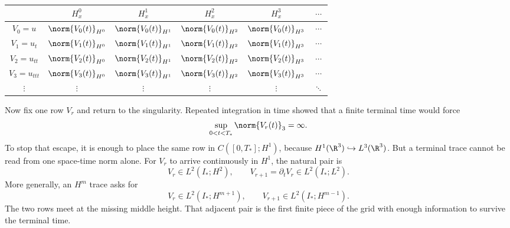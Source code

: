 \begin{center}
\captionsetup{hypcap=false}
\label{tab:MixedDerivativeGrid}
\renewcommand{\arraystretch}{1.4}
\begin{tabular}{@{}c c c c c c@{}}
\toprule
& \(H^0_x\) & \(H^1_x\) & \(H^2_x\) & \(H^3_x\) & \(\cdots\) \\
\midrule
\(V_0=u\) & \(\norm{V_0(t)}_{H^0}\) & \(\norm{V_0(t)}_{H^1}\) & \(\norm{V_0(t)}_{H^2}\) & \(\norm{V_0(t)}_{H^3}\) & \(\cdots\) \\
\(V_1=u_t\) & \(\norm{V_1(t)}_{H^0}\) & \(\norm{V_1(t)}_{H^1}\) & \(\norm{V_1(t)}_{H^2}\) & \(\norm{V_1(t)}_{H^3}\) & \(\cdots\) \\
\(V_2=u_{tt}\) & \(\norm{V_2(t)}_{H^0}\) & \(\norm{V_2(t)}_{H^1}\) & \(\norm{V_2(t)}_{H^2}\) & \(\norm{V_2(t)}_{H^3}\) & \(\cdots\) \\
\(V_3=u_{ttt}\) & \(\norm{V_3(t)}_{H^0}\) & \(\norm{V_3(t)}_{H^1}\) & \(\norm{V_3(t)}_{H^2}\) & \(\norm{V_3(t)}_{H^3}\) & \(\cdots\) \\
\(\vdots\) & \(\vdots\) & \(\vdots\) & \(\vdots\) & \(\vdots\) & \(\ddots\) \\
\bottomrule
\end{tabular}
\end{center}

Now fix one row \(V_r\) and return to the singularity.  Repeated integration in time
showed that a finite terminal time would force
\[
  \sup_{0<t<T_*}\norm{V_r(t)}_3=\infty.
\]
To stop that escape, it is enough to place the same row in
\(C([0,T_*];H^1)\), because \(H^1(\R^3)\hookrightarrow L^3(\R^3)\).  But a terminal
trace cannot be read from one space-time norm alone.  For \(V_r\) to arrive
continuously in \(H^1\), the natural pair is
\[
  V_r\in L^2(I_*;H^2),
  \qquad
  V_{r+1}=\partial_tV_r\in L^2(I_*;L^2).
\]
More generally, an \(H^m\) trace asks for
\[
  V_r\in L^2(I_*;H^{m+1}),
  \qquad
  V_{r+1}\in L^2(I_*;H^{m-1}).
\]
The two rows meet at the missing middle height.  That adjacent pair is the first finite
piece of the grid with enough information to survive the terminal time.
